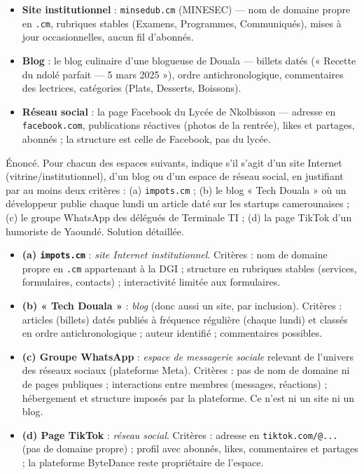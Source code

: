 \documentclass[11pt]{article}
\begin{document}
\begin{exemplebox}
\begin{itemize}
  \item \textbf{Site institutionnel} : \texttt{minsedub.cm} (MINESEC) — nom de domaine propre en \texttt{.cm}, rubriques stables (Examens, Programmes, Communiqués), mises à jour occasionnelles, aucun fil d'abonnés.
  \item \textbf{Blog} : le blog culinaire d'une blogueuse de Douala — billets datés (« Recette du ndolé parfait — 5 mars 2025 »), ordre antichronologique, commentaires des lectrices, catégories (Plats, Desserts, Boissons).
  \item \textbf{Réseau social} : la page Facebook du Lycée de Nkolbisson — adresse en \texttt{facebook.com}, publications réactives (photos de la rentrée), likes et partages, abonnés ; la structure est celle de Facebook, pas du lycée.
\end{itemize}
\end{exemplebox}

\begin{exoresolu}
Énoncé. Pour chacun des espaces suivants, indique s'il s'agit d'un site Internet (vitrine/institutionnel), d'un blog ou d'un espace de réseau social, en justifiant par au moins deux critères : (a) \texttt{impots.cm} ; (b) le blog « Tech Douala » où un développeur publie chaque lundi un article daté sur les startups camerounaises ; (c) le groupe WhatsApp des délégués de Terminale TI ; (d) la page TikTok d'un humoriste de Yaoundé.
\tcblower
Solution détaillée.
\begin{itemize}
  \item \textbf{(a) \texttt{impots.cm}} : \emph{site Internet institutionnel}. Critères : nom de domaine propre en \texttt{.cm} appartenant à la DGI ; structure en rubriques stables (services, formulaires, contacts) ; interactivité limitée aux formulaires.
  \item \textbf{(b) « Tech Douala »} : \emph{blog} (donc aussi un site, par inclusion). Critères : articles (billets) datés publiés à fréquence régulière (chaque lundi) et classés en ordre antichronologique ; auteur identifié ; commentaires possibles.
  \item \textbf{(c) Groupe WhatsApp} : \emph{espace de messagerie sociale} relevant de l'univers des réseaux sociaux (plateforme Meta). Critères : pas de nom de domaine ni de pages publiques ; interactions entre membres (messages, réactions) ; hébergement et structure imposés par la plateforme. Ce n'est ni un site ni un blog.
  \item \textbf{(d) Page TikTok} : \emph{réseau social}. Critères : adresse en \texttt{tiktok.com/@...} (pas de domaine propre) ; profil avec abonnés, likes, commentaires et partages ; la plateforme ByteDance reste propriétaire de l'espace.
\end{itemize}
\end{exoresolu}
\end{document}
